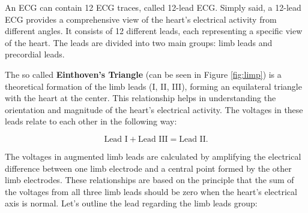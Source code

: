 \documentclass{mldsmsc}
\begin{document}
\noindent An ECG can contain 12 ECG traces, called 12-lead ECG. Simply said, a 12-lead ECG provides a comprehensive view of the heart's electrical activity from different angles. It consists of 12 different leads, each representing a specific view of the heart. The leads are divided into two main groups: limb leads and precordial leads. \newline

\noindent The so called  \textbf{Einthoven's Triangle} (can be seen in Figure \ref{fig:limp}) is a theoretical formation of the limb leads (I, II, III), forming an equilateral triangle with the heart at the center. This relationship helps in understanding the orientation and magnitude of the heart's electrical activity. The voltages in these leads relate to each other in the following way:

\begin{equation}
    \text{Lead I} + \text{Lead III} = \text{Lead II}.
\end{equation}

\noindent The voltages in augmented limb leads are calculated by amplifying the electrical difference between one limb electrode and a central point formed by the other limb electrodes. These relationships are based on the principle that the sum of the voltages from all three limb leads should be zero when the heart's electrical axis is normal. Let's outline the lead regarding the limb leads group: \newline
\end{document}
